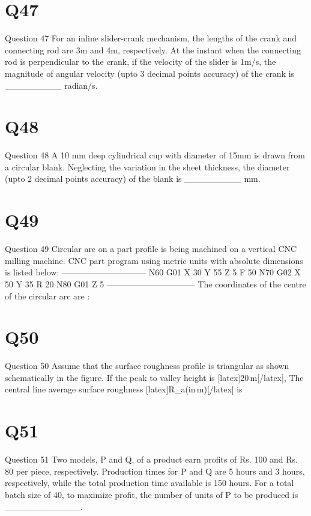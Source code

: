 \section*{Q47}
Question 47 For an inline slider-crank mechanism, the lengths of the crank and connecting rod are 3m and 4m, respectively. At the instant when the connecting rod is perpendicular to the crank, if the velocity of the slider is 1m/s, the magnitude of angular velocity (upto 3 decimal points accuracy) of the crank is \_\_\_\_\_\_\_\_\_ radian/s.

\section*{Q48}
Question 48 A 10 mm deep cylindrical cup with diameter of 15mm is drawn from a circular blank. Neglecting the variation in the sheet thickness, the diameter (upto 2 decimal points accuracy) of the blank is \_\_\_\_\_\_\_\_\_ mm.

\section*{Q49}
Question 49 Circular arc on a part profile is being machined on a vertical CNC milling machine. CNC part program using metric units with absolute dimensions is listed below: ------------------------------ N60 G01 X 30 Y 55 Z 5 F 50 N70 G02 X 50 Y 35 R 20 N80 G01 Z 5 -------------------------------- The coordinates of the centre of the circular arc are :

\section*{Q50}
Question 50 Assume that the surface roughness profile is triangular as shown schematically in the figure. If the peak to valley height is [latex]20\,\mu m[/latex], The central line average  surface roughness [latex]R\_{a}(in\,\mu m)[/latex]  is

\section*{Q51}
Question 51 Two models, P and Q, of a product earn profits of Rs. 100 and Rs. 80 per piece, respectively. Production times for P and Q are 5 hours and 3 hours, respectively, while the total production time available is 150 hours. For a total batch size of 40, to maximize profit, the number of units of P to be produced is \_\_\_\_\_\_\_\_\_\_\_\_.

